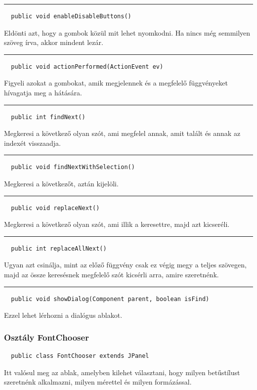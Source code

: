 \documentclass[12pt]{article}
\newcommand{\vonal}{\noindent\rule{\textwidth}{1pt}}
\begin{document}
\vonal
\begin{lstlisting}
  public void enableDisableButtons()
\end{lstlisting}
Eldönti azt, hogy a gombok közül mit lehet nyomkodni. Ha nincs még semmilyen
szöveg írva, akkor mindent lezár.

\vonal
\begin{lstlisting}
  public void actionPerformed(ActionEvent ev)
\end{lstlisting}
Figyeli azokat a gombokat, amik megjelennek és a megfelelő függvényeket hívagatja
meg a hátására.

\vonal
\begin{lstlisting}
  public int findNext()
\end{lstlisting}
Megkeresi a következő olyan szót, ami megfelel annak, amit talált és annak az
indexét visszaadja.

\vonal
\begin{lstlisting}
  public void findNextWithSelection()
\end{lstlisting}
Megkeresi a következőt, aztán kijelöli.

\vonal
\begin{lstlisting}
  public void replaceNext()
\end{lstlisting}
Megkeresi a következő olyan szót, ami illik a keresettre, majd azt kicseréli.

\vonal
\begin{lstlisting}
  public int replaceAllNext()
\end{lstlisting}
Ugyan azt csinálja, mint az előző függvény csak ez végig megy a teljes szövegen,
majd az össze keresésnek megfelelő szót kicsérli arra, amire szeretnénk.

\vonal
\begin{lstlisting}
  public void showDialog(Component parent, boolean isFind)
\end{lstlisting}
Ezzel lehet lérhozni a dialógus ablakot.

\subsubsection*{Osztály FontChooser}
\begin{lstlisting}
  public class FontChooser extends JPanel
\end{lstlisting}
Itt valósul meg az ablak, amelyben kilehet választani, hogy milyen betűstílust
szeretnénk alkalmazni, milyen mérettel és milyen formázással.
\end{document}
